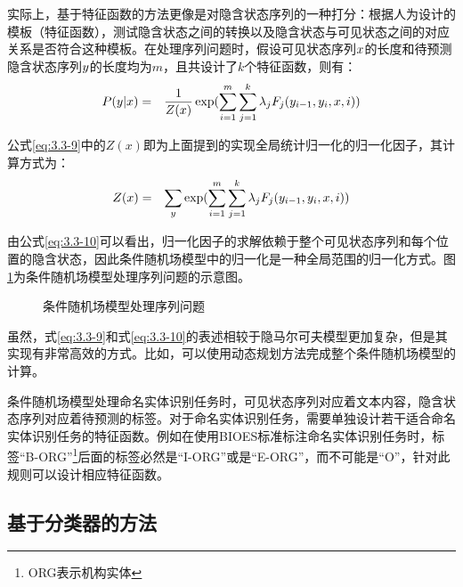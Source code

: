 \parinterval 实际上，基于特征函数的方法更像是对隐含状态序列的一种打分：根据人为设计的模板（特征函数），测试隐含状态之间的转换以及隐含状态与可见状态之间的对应关系是否符合这种模板。在处理序列问题时，假设可见状态序列${x}$的长度和待预测隐含状态序列${y}$的长度均为$m$，且共设计了$k$个特征函数，则有：
\begin{eqnarray}
{P}({y}|{x}) & = & \frac{1}{Z({x})}\exp(\sum_{i=1}^m\sum_{j=1}^{k}\lambda_{j}F_{j}(y_{i-1},y_i,{x},i))
\label{eq:3.3-9}
\end{eqnarray}

\parinterval 公式\eqref{eq:3.3-9}中的$Z(x)$即为上面提到的实现全局统计归一化的归一化因子，其计算方式为：
\begin{eqnarray}
Z({x})&=&\sum_{{y}}\exp(\sum_{i=1}^m\sum_{j=1}^k\lambda_{j}F_{j}(y_{i-1},y_i,{x},i))
\label{eq:3.3-10}
\end{eqnarray}

\parinterval 由公式\eqref{eq:3.3-10}可以看出，归一化因子的求解依赖于整个可见状态序列和每个位置的隐含状态，因此条件随机场模型中的归一化是一种全局范围的归一化方式。图\ref{fig:3.3-6}为条件随机场模型处理序列问题的示意图。

\begin{figure}[htp]
\centering

\caption{条件随机场模型处理序列问题}
\label{fig:3.3-6}
\end{figure}

\parinterval 虽然，式\eqref{eq:3.3-9}和式\eqref{eq:3.3-10}的表述相较于隐马尔可夫模型更加复杂，但是其实现有非常高效的方式。比如，可以使用动态规划方法完成整个条件随机场模型的计算。

\parinterval 条件随机场模型处理命名实体识别任务时，可见状态序列对应着文本内容，隐含状态序列对应着待预测的标签。对于命名实体识别任务，需要单独设计若干适合命名实体识别任务的特征函数。例如在使用BIOES标准标注命名实体识别任务时，标签“B-ORG”\footnote{ORG表示机构实体}后面的标签必然是“I-ORG”或是“E-ORG”，而不可能是“O”，针对此规则可以设计相应特征函数。


\subsection{基于分类器的方法}

